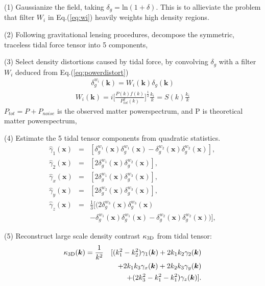 (1) Gaussianize the field, taking 
$\delta_g=\mathrm{ln}(1+\delta)$. 
This is to allieviate the problem that filter $W_i$ in Eq.(\ref{eq:wi}) heavily weights high density regions.

(2) Following gravitational lensing procedures, decompose the symmetric, traceless tidal force tensor into 5 components, 

(3) Select density distortions caused by tidal force, 
by convolving $\delta_g$ with a filter $W_i$ 
deduced from Eq.(\ref{eq:powerdistort}) 
\begin{eqnarray}
\delta^{w_i}_g(\bm{k})=W_i(\bm{k})\delta_g(\bm{k}) 
\end{eqnarray}
\begin{eqnarray}
\label{eq:wi}
W_i(\bm{k})=i \bigg[\frac{P(k)f(k)}{P_{tot}^2(k)}\bigg]^{\frac{1}{2}}\frac{k_i}{k}
=S(k)\frac{k_i}{k}\nonumber
\end{eqnarray}
$P_{tot}=P+P_{noise}$ is the observed matter powerspectrum, 
and P is theoretical matter powerspectrum,

(4) Estimate the 5 tidal tensor components from quadratic statistics.
\begin{eqnarray}
\label{eq:gamma}
\hat{\gamma}_1(\bm{x})&=&
[{\delta}^{w_1}_g(\bm{x}){\delta}^{w_1}_g(\bm{x})-
{\delta}^{w_2}_g(\bm{x}){\delta}^{w_2}_g(\bm{x})],\nonumber\\
\hat{\gamma}_2(\bm{x})&=&
[2{\delta}^{w_1}_g(\bm{x}){\delta}^{w_2}_g(\bm{x})],\nonumber\\
\hat{\gamma}_x(\bm{x})&=&
[2{\delta}^{w_1}_g(\bm{x}){\delta}^{w_3}_g(\bm{x})],\\
\hat{\gamma}_y(\bm{x})&=&
[2{\delta}^{w_2}_g(\bm{x}){\delta}^{w_3}_g(\bm{x})],\nonumber\\
\hat{\gamma}_z(\bm{x})&=&
\frac{1}{3}[(2{\delta}^{w_3}_g(\bm{x}){\delta}^{w_3}_g(\bm{x})\nonumber\\
&&-{\delta}^{w_1}_g(\bm{x}){\delta}^{w_1}_g(\bm{x})
-{\delta}^{w_2}_g(\bm{x}){\delta}^{w_2}_g(\bm{x}))],\nonumber
\end{eqnarray}

(5) Reconstruct large scale density contrast $\kappa_\mathrm{3D}$ from tidal tensor:
\begin{eqnarray}
\kappa_\mathrm{3D}(\bm{k})=\frac{1}{k^2}
&&[(k_1^2-k_2^2)\gamma_1(\bm{k})+2k_1k_2\gamma_2(\bm{k})\nonumber\\
&&+2k_1k_3\gamma_x(\bm{k})+2k_2k_3\gamma_y(\bm{k})\\\nonumber
&&+(2k_3^2-k_1^2-k_1^2)\gamma_z(\bm{k})].
\end{eqnarray}

